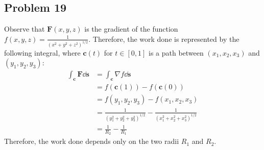 \documentclass[11pt]{article}
\renewcommand{\vec}[1]{\mathbf{#1}}
\newcommand{\mat}[1]{\mathbf{#1}}
\renewcommand{\grad}{\nabla}
\begin{document}

\subsection*{Problem 19}

Observe that $\mat{F}(x, y, z)$ is the gradient of the function $f(x, y, z) = \tfrac{1}{(x^{2} + y^{2} + z^{2})^{1/2}}$. Therefore, the work done is represented by the following integral, where $\vec{c}(t)$ for $t \in [0, 1]$ is a path between $(x_{1}, x_{2}, x_{3})$ and $(y_{1}, y_{2}, y_{3})$:
\begin{align*}
	\int_{\vec{c}} \mathbf{F} \dd{\vec{s}} &= \int_{\vec{c}} \grad f \dd{\vec{s}} \\ 
	&= f(\vec{c}(1)) - f(\vec{c}(0)) \\
	&= f(y_{1}, y_{2}, y_{3}) - f(x_{1}, x_{2}, x_{3}) \\
	&= \frac{1}{(y_{1}^{2} + y_{2}^{2} + y_{3}^{2})^{1/2}} - \frac{1}{(x_{1}^{2} + x_{2}^{2} + x_{3}^{2})^{1/2}} \\
	&= \frac{1}{R_{2}} - \frac{1}{R_{1}}
\end{align*}
Therefore, the work done depends only on the two radii $R_{1}$ and $R_{2}$.

\end{document}
